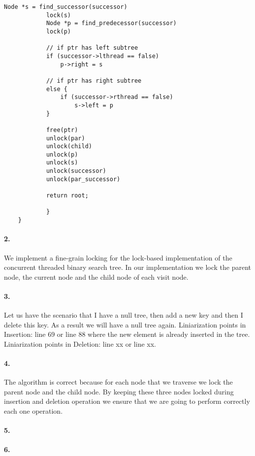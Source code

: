 \begin{lstlisting}[style=mycode]
			Node *s = find_successor(successor)
			lock(s)
			Node *p = find_predecessor(successor)
			lock(p)

			// if ptr has left subtree
			if (successor->lthread == false)
				p->right = s

			// if ptr has right subtree
			else {
				if (successor->rthread == false)
					s->left = p
			}

			free(ptr)
			unlock(par)
			unlock(child)
			unlock(p)
			unlock(s)
			unlock(successor)
			unlock(par_successor)

			return root;
				
			}
	}

\end{lstlisting}

\paragraph{2.}
We implement a fine-grain locking for the lock-based implementation of
the concurrent threaded binary search tree. In our implementation we
lock the parent node, the current node and the child node of each
visit node.

\paragraph{3.}
Let us have the scenario that I have a null tree, then add a new key
and then I delete this key. As a result we will have a null tree
again.
Liniarization points in Insertion: line 69 or line 88 where the new
element is already inserted in the tree.
Liniarization points in Deletion: line xx or line xx.

\paragraph{4.}
The algorithm is correct because for each node that we traverse we
lock the parent node and the child node. By keeping these three nodes
locked during insertion and deletion operation we ensure that we are
going to perform correctly each one operation.

\paragraph{5.}


\paragraph{6.}

